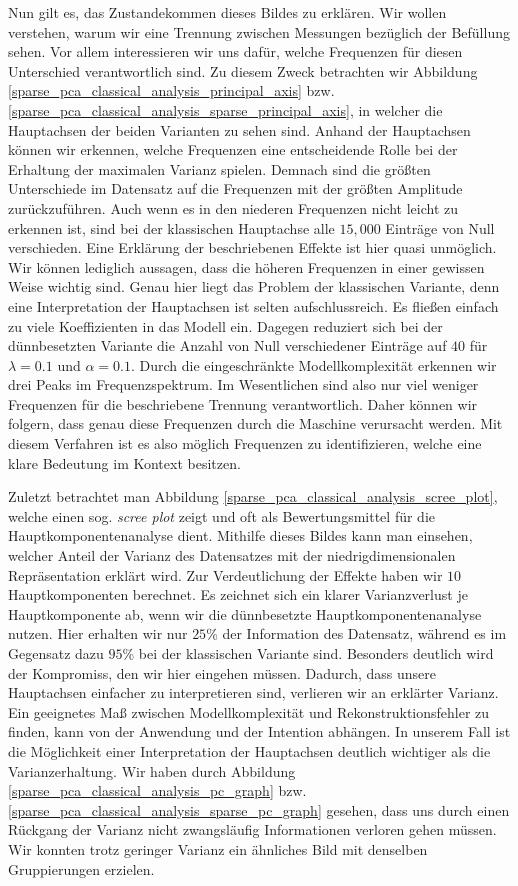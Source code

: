 Nun gilt es, das Zustandekommen dieses Bildes zu erklären. Wir wollen verstehen, warum wir eine Trennung zwischen Messungen bezüglich der Befüllung sehen. Vor allem interessieren wir uns dafür, welche Frequenzen für diesen Unterschied verantwortlich sind. Zu diesem Zweck betrachten wir Abbildung \ref{sparse_pca_classical_analysis_principal_axis} bzw. \ref{sparse_pca_classical_analysis_sparse_principal_axis}, in welcher die Hauptachsen der beiden Varianten zu sehen sind. Anhand der Hauptachsen können wir erkennen, welche Frequenzen eine entscheidende Rolle bei der Erhaltung der maximalen Varianz spielen. Demnach sind die größten Unterschiede im Datensatz auf die Frequenzen mit der größten Amplitude zurückzuführen. Auch wenn es in den niederen Frequenzen nicht leicht zu erkennen ist, sind bei der klassischen Hauptachse alle $15,000$ Einträge von Null verschieden. Eine Erklärung der beschriebenen Effekte ist hier quasi unmöglich. Wir können lediglich aussagen, dass die höheren Frequenzen in einer gewissen Weise wichtig sind. Genau hier liegt das Problem der klassischen Variante, denn eine Interpretation der Hauptachsen ist selten aufschlussreich. Es fließen einfach zu viele Koeffizienten in das Modell ein. Dagegen reduziert sich bei der dünnbesetzten Variante die Anzahl von Null verschiedener Einträge auf $40$ für $\lambda = 0.1$ und $\alpha = 0.1$. Durch die eingeschränkte Modellkomplexität erkennen wir drei Peaks im Frequenzspektrum. Im Wesentlichen sind also nur viel weniger Frequenzen für die beschriebene Trennung verantwortlich. Daher können wir folgern, dass genau diese Frequenzen durch die Maschine verursacht werden. Mit diesem Verfahren ist es also möglich Frequenzen zu identifizieren, welche eine klare Bedeutung im Kontext besitzen.

Zuletzt betrachtet man Abbildung \ref{sparse_pca_classical_analysis_scree_plot}, welche einen sog. \textit{scree plot} zeigt und oft als Bewertungsmittel für die Hauptkomponentenanalyse dient. Mithilfe dieses Bildes kann man einsehen, welcher Anteil der Varianz des Datensatzes mit der niedrigdimensionalen Repräsentation erklärt wird. Zur Verdeutlichung der Effekte haben wir $10$ Hauptkomponenten berechnet. Es zeichnet sich ein klarer Varianzverlust je Hauptkomponente ab, wenn wir die dünnbesetzte Hauptkomponentenanalyse nutzen. Hier erhalten wir nur $25$\% der Information des Datensatz, während es im Gegensatz dazu $95$\% bei der klassischen Variante sind. Besonders deutlich wird der Kompromiss, den wir hier eingehen müssen. Dadurch, dass unsere Hauptachsen einfacher zu interpretieren sind, verlieren wir an erklärter Varianz. Ein geeignetes Maß zwischen Modellkomplexität und Rekonstruktionsfehler zu finden, kann von der Anwendung und der Intention abhängen. In unserem Fall ist die Möglichkeit einer Interpretation der Hauptachsen deutlich wichtiger als die Varianzerhaltung. Wir haben durch Abbildung \ref{sparse_pca_classical_analysis_pc_graph} bzw. \ref{sparse_pca_classical_analysis_sparse_pc_graph} gesehen, dass uns durch einen Rückgang der Varianz nicht zwangsläufig Informationen verloren gehen müssen. Wir konnten trotz geringer Varianz ein ähnliches Bild mit denselben Gruppierungen erzielen.

